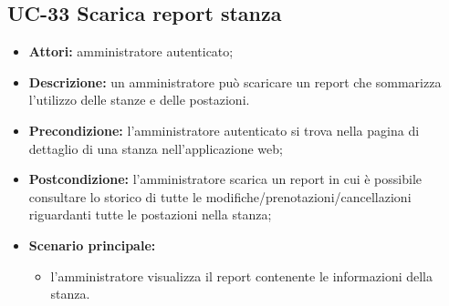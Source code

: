 \subsection{UC-33 Scarica report stanza}
\begin{itemize}
    \item \textbf{Attori:} amministratore autenticato;
    \item \textbf{Descrizione:} un amministratore pu\`{o} scaricare un report che sommarizza l'utilizzo delle stanze e delle postazioni.
    \item \textbf{Precondizione:} l'amministratore autenticato si trova nella pagina di dettaglio di una stanza nell'applicazione web;
    \item \textbf{Postcondizione:} l'amministratore scarica un report in cui \`{e} possibile consultare lo storico di tutte le modifiche/prenotazioni/cancellazioni riguardanti tutte le postazioni nella stanza;
    \item \textbf{Scenario principale:}
    \begin{itemize}
        \item l'amministratore visualizza il report contenente le informazioni della stanza.
    \end{itemize}
\end{itemize}